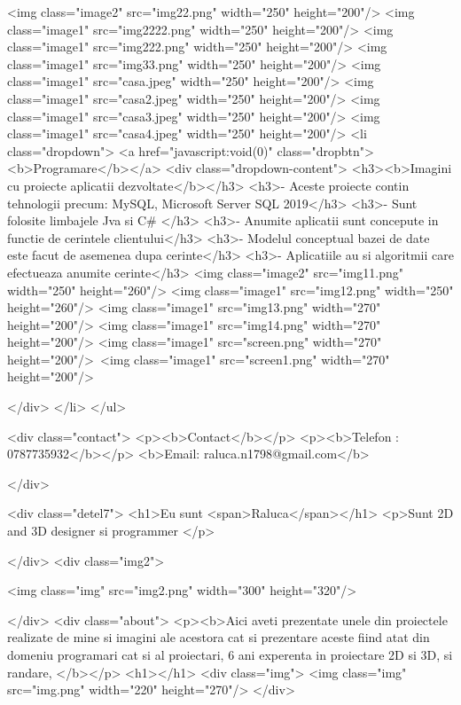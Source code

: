 {          <img class="image2" src="img22.png" width="250" height="200"/>
          <img class="image1" src="img2222.png" width="250" height="200"/>
          <img class="image1" src="img222.png" width="250" height="200"/>
          <img class="image1" src="img33.png" width="250" height="200"/>
          <img class="image1" src="casa.jpeg" width="250" height="200"/>
          <img class="image1" src="casa2.jpeg" width="250" height="200"/>
          <img class="image1" src="casa3.jpeg" width="250" height="200"/>
          <img class="image1" src="casa4.jpeg" width="250" height="200"/>
    <li class="dropdown">
      <a href="javascript:void(0)" class="dropbtn"><b>Programare</b></a>
      <div class="dropdown-content">
        <h3><b>Imagini cu proiecte aplicatii dezvoltate</b></h3>
        <h3>- Aceste proiecte contin tehnologii precum: MySQL, Microsoft Server SQL 2019</h3>
        <h3>- Sunt folosite limbajele Jva si C#  </h3>
        <h3>- Anumite aplicatii sunt concepute in functie de cerintele clientului</h3>
        <h3>- Modelul conceptual bazei de date este facut de asemenea dupa cerinte</h3>
        <h3>- Aplicatiile au si algoritmii care efectueaza anumite cerinte</h3>
        <img class="image2" src="img11.png" width="250" height="260"/>
        <img class="image1" src="img12.png" width="250" height="260"/>
        <img class="image1" src="img13.png" width="270" height="200"/>
        <img class="image1" src="img14.png" width="270" height="200"/>
        <img class="image1" src="screen.png" width="270" height="200"/>\
        <img class="image1" src="screen1.png" width="270" height="200"/>
        
      
      </div>
    </li>
  </ul>
  

  <div class="contact">
    <p><b>Contact</b></p>
    <p><b>Telefon : 0787735932</b></p>
    <b>Email: raluca.n1798@gmail.com</b>

  </div>

  <div class="detel7">
    <h1>Eu sunt <span>Raluca</span></h1>
    <p>Sunt 2D and 3D designer si programmer </p>
  
   
 </div>
 <div class="img2">

  <img class="img" src="img2.png" width="300" height="320"/>

 </div>
  <div class="about">
    <p><b>Aici aveti prezentate unele din proiectele realizate de mine si imagini ale acestora cat si prezentare aceste fiind atat din domeniu programari cat si al proiectari, 6 ani experenta in proiectare 2D si 3D, si randare, </b></p>
    <h1></h1>
    <div class="img">
      <img class="img" src="img.png" width="220" height="270"/>
  </div>
 


}
